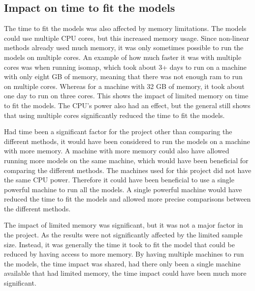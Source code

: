 \subsection{Impact on time to fit the models}\label{subsec:impact_on_time_to_fit_the_models}
The time to fit the models was also affected by memory limitations. The models could use multiple CPU cores, but this increased memory usage. Since non-linear methods already used much memory, it was only sometimes possible to run the models on multiple cores. An example of how much faster it was with multiple cores was when running \gls{isomap}, which took about 3+ days to run on a machine with only eight GB of memory, meaning that there was not enough ram to run on multiple cores. Whereas for a machine with 32 GB of memory, it took about one day to run on three cores. This shows the impact of limited memory on time to fit the models. The CPU's power also had an effect, but the general still shows that using multiple cores significantly reduced the time to fit the models.

Had time been a significant factor for the project other than comparing the different methods, it would have been considered to run the models on a machine with more memory. A machine with more memory could also have allowed running more models on the same machine, which would have been beneficial for comparing the different methods. The machines used for this project did not have the same CPU power. Therefore it could have been beneficial to use a single powerful machine to run all the models. A single powerful machine would have reduced the time to fit the models and allowed more precise comparisons between the different methods.

The impact of limited memory was significant, but it was not a major factor in the project. As the results were not significantly affected by the limited sample size. Instead, it was generally the time it took to fit the model that could be reduced by having access to more memory. By having multiple machines to run the models, the time impact was shared, had there only been a single machine available that had limited memory, the time impact could have been much more significant.


